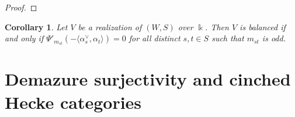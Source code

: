 \documentclass{amsart}
\theoremstyle{plain}
\newtheorem{cor}[thm]{Corollary}
\theoremstyle{definition}
\theoremstyle{remark}
\numberwithin{equation}{section}
\newcommand{\ZZ}{\mathbb{Z}}
\begin{document}
\begin{proof}
%
%
\end{proof}

\begin{cor} \label{cor:balancedcriterion}
Let $V$ be a realization of $(W,S)$ over $\Bbbk$.
Then $V$ is balanced if and only if $\Psi'_{m_{st}}(-\langle \alpha_s^\vee, \alpha_t \rangle)=0$ for all distinct $s,t \in S$ such that $m_{st}$ is odd. 
\end{cor}



\section{Demazure surjectivity and cinched Hecke categories}
\end{document}
